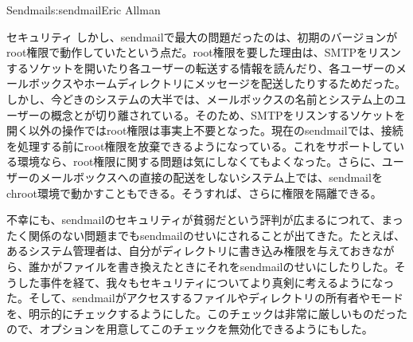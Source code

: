 \begin{aosachapter}{Sendmail}{s:sendmail}{Eric Allman}
\begin{aosasect1}{セキュリティ}
しかし、sendmailで最大の問題だったのは、初期のバージョンがroot権限で動作していたという点だ。root権限を要した理由は、SMTPをリスンするソケットを開いたり各ユーザーの転送する情報を読んだり、各ユーザーのメールボックスやホームディレクトリにメッセージを配送したりするためだった。しかし、今どきのシステムの大半では、メールボックスの名前とシステム上のユーザーの概念とが切り離されている。そのため、SMTPをリスンするソケットを開く以外の操作ではroot権限は事実上不要となった。現在のsendmailでは、接続を処理する前にroot権限を放棄できるようになっている。これをサポートしている環境なら、root権限に関する問題は気にしなくてもよくなった。さらに、ユーザーのメールボックスへの直接の配送をしないシステム上では、sendmailをchroot環境で動かすこともできる。そうすれば、さらに権限を隔離できる。

不幸にも、sendmailのセキュリティが貧弱だという評判が広まるにつれて、まったく関係のない問題までもsendmailのせいにされることが出てきた。たとえば、あるシステム管理者は、自分がディレクトリに書き込み権限を与えておきながら、誰かがファイルを書き換えたときにそれをsendmailのせいにしたりした。そうした事件を経て、我々もセキュリティについてより真剣に考えるようになった。そして、sendmailがアクセスするファイルやディレクトリの所有者やモードを、明示的にチェックするようにした。このチェックは非常に厳しいものだったので、オプションを用意してこのチェックを無効化できるようにもした。


\end{aosasect1}
\end{aosachapter}
